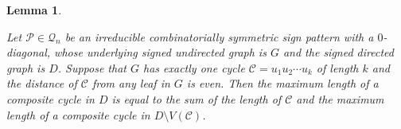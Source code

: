 \documentclass[10pt,a4paper]{amsart}
\newtheorem{lemma}{Lemma}[section]
\numberwithin{equation}{section}
\begin{document}

\begin{lemma}\label{l28}
	
	Let $\mathcal{P}\in \mathcal{Q}_n$ be an irreducible combinatorially symmetric sign pattern with a $0$-diagonal, whose underlying signed undirected graph is $G$ and the signed directed graph is $D$. Suppose that $G$ has exactly one cycle $\mathcal{C}=u_1u_2\cdots u_k$ of length $k$ and the distance of $\mathcal{C}$ from any leaf in $G$ is even. Then the maximum length of a composite cycle in $D$ is equal to the sum of the length of $\mathcal{C}$ and the maximum length of a composite cycle in $D\setminus V(\mathcal{C})$.       
\end{lemma}
\end{document}
